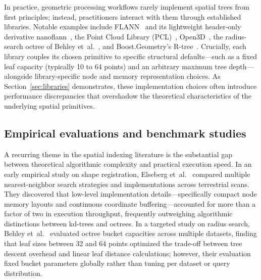 In practice, geometric processing workflows rarely implement spatial trees from first principles; instead, practitioners interact with them through established libraries. Notable examples include FLANN~\cite{muja2009flann} and its lightweight header-only derivative nanoflann~\cite{blanco2014nanoflann}, the Point Cloud Library (PCL)~\cite{rusu2011pcl}, Open3D~\cite{zhou2018open3d}, the radius-search octree of Behley et~al.~\cite{behley2015octree}, and Boost.Geometry's R-tree~\cite{boost_geometry}. Crucially, each library couples its chosen primitive to specific structural defaults---such as a fixed leaf capacity (typically 10 to 64 points) and an arbitrary maximum tree depth---alongside library-specific node and memory representation choices. As Section~\ref{sec:libraries} demonstrates, these implementation choices often introduce performance discrepancies that overshadow the theoretical characteristics of the underlying spatial primitives.

\subsection{Empirical evaluations and benchmark studies}

A recurring theme in the spatial indexing literature is the substantial gap between theoretical algorithmic complexity and practical execution speed. In an early empirical study on shape registration, Elseberg et~al.~\cite{elseberg2012comparison} compared multiple nearest-neighbor search strategies and implementations across terrestrial scans. They discovered that low-level implementation details---specifically compact node memory layouts and continuous coordinate buffering---accounted for more than a factor of two in execution throughput, frequently outweighing algorithmic distinctions between kd-trees and octrees. In a targeted study on radius search, Behley et~al.~\cite{behley2015octree} evaluated octree bucket capacities across multiple datasets, finding that leaf sizes between 32 and 64 points optimized the trade-off between tree descent overhead and linear leaf distance calculations; however, their evaluation fixed bucket parameters globally rather than tuning per dataset or query distribution.

